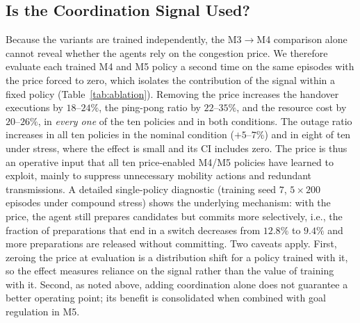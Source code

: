 \documentclass[journal]{IEEEtran}
\begin{document}
\subsection{Is the Coordination Signal Used?}
Because the variants are trained independently, the M3$\to$M4 comparison
alone cannot reveal whether the agents rely on the congestion price. We
therefore evaluate each trained M4 and M5 policy a second time on the same
episodes with the price forced to zero, which isolates the contribution of the
signal within a fixed policy (Table~\ref{tab:ablation}). Removing the price increases the handover
executions by $18$--$24\%$, the ping-pong ratio by $22$--$35\%$, and the
resource cost by $20$--$26\%$, in \emph{every one} of the ten policies and in
both conditions. The outage ratio increases in all ten policies in the nominal
condition ($+5$--$7\%$) and in eight of ten under stress, where the effect is
small and its CI includes zero. The price is thus an operative input that
all ten price-enabled M4/M5 policies have learned to exploit, mainly to
suppress unnecessary mobility actions and redundant transmissions. A detailed single-policy
diagnostic (training seed $7$, $5\times200$ episodes under compound stress)
shows the underlying mechanism: with the price, the agent still prepares
candidates but commits more selectively, i.e., the fraction of preparations
that end in a switch decreases from $12.8\%$ to $9.4\%$ and more preparations
are released without committing. Two caveats apply. First, zeroing the price
at evaluation is a distribution shift for a policy trained with it, so the
effect measures reliance on the signal rather than the value of training with
it. Second, as noted above, adding coordination alone does not guarantee a
better operating point; its benefit is consolidated when combined with goal
regulation in M5.
\end{document}
